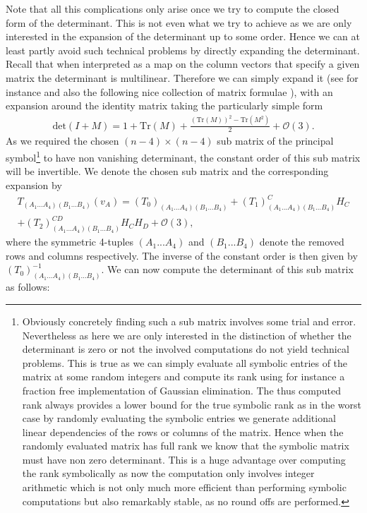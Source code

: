 \documentclass[a4paper,12pt, DIV=14, BCOR=5mm, twoside, headsepline]{scrbook}
\begin{document}
Note that all this complications only arise once we try to compute the closed form of the determinant. This is not even what we try to achieve as we are only interested in the expansion of the determinant up to some order. Hence we can at least partly avoid such technical problems by directly expanding the determinant. Recall that when interpreted as a map on the column vectors that specify a given matrix the determinant is multilinear. Therefore we can simply expand it (see for instance \cite{2008CoTPh..49..801Z} and also the following nice collection of matrix formulae \cite{IMM2012-03274}), with an expansion around the identity matrix taking the particularly simple form 
\begin{align}\label{detExp}
    \mathrm{det}(I+M) = 1 + \mathrm{Tr}(M) + \frac{(\mathrm{Tr}(M))^2- \mathrm{Tr}(M^2)}{2} + \mathcal{O}(3). 
\end{align}
As we required the chosen $(n-4)\times (n-4)$ sub matrix of the principal symbol\footnote{Obviously concretely finding such a sub matrix involves some trial and error. Nevertheless as here we are only interested in the distinction of whether the determinant is zero or not the involved computations do not yield technical problems. This is true as we can simply evaluate all symbolic entries of the matrix at some random integers and compute its rank using for instance a fraction free implementation of Gaussian elimination. The thus computed rank always provides a lower bound for the true symbolic rank as in the worst case by randomly evaluating the symbolic entries we generate additional linear dependencies of the rows or columns of the matrix. Hence when the randomly evaluated matrix has full rank we know that the symbolic matrix must have non zero determinant. This is a huge advantage over computing the rank symbolically as now the computation only involves integer arithmetic which is not only much more efficient than performing symbolic computations but also remarkably stable, as no round offs are performed.} to have non vanishing determinant, the constant order of this sub matrix will be invertible. We denote the chosen sub matrix and the corresponding expansion by 
\begin{multline}
    T_{(A_1...A_4)(B_1...B_4)}(v_A) = (T_0)_{(A_1...A_4)(B_1...B_4)} + (T_1)_{(A_1...A_4)(B_1...B_4)}^{C} H_C \\
    +(T_2)_{(A_1...A_4)(B_1...B_4)}^{CD} H_C H_D + \mathcal{O}(3),
\end{multline}
where the symmetric 4-tuples $(A_1...A_4)$ and $(B_1...B_4)$ denote the removed rows and columns respectively. The inverse of the constant order is then given by $(T_0)^{-1}_{(A_1...A_4)(B_1...B_4)}$. We can now compute the determinant of this sub matrix as follows:
\end{document}
